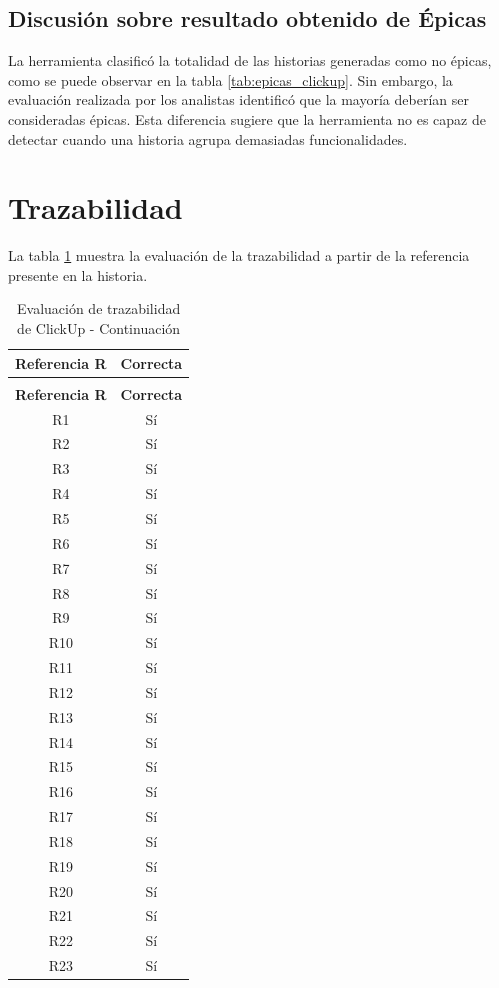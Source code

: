 \subsection{Discusión sobre resultado obtenido de Épicas}
La herramienta clasificó la totalidad de las historias generadas como no épicas, como se puede observar en la tabla \ref{tab:epicas_clickup}. Sin embargo, la evaluación realizada por los analistas identificó que la mayoría deberían ser consideradas épicas. Esta diferencia sugiere que la herramienta no es capaz de detectar cuando una historia agrupa demasiadas funcionalidades.

\section{Trazabilidad}
La tabla \ref{tab:trazabilidad_clickup} muestra la evaluación de la trazabilidad a partir de la referencia presente en la historia.

\begin{longtable}{|c|c|}
\caption{Evaluación de trazabilidad de ClickUp} 
\label{tab:trazabilidad_clickup} \\
\hline
\textbf{Referencia R} & \textbf{Correcta} \\
\hline
\endfirsthead
\caption{Evaluación de trazabilidad de ClickUp - Continuación} \\
\hline
\textbf{Referencia R} & \textbf{Correcta} \\
\hline
\endhead
\hline
\endfoot
\hline
\endlastfoot
R1 & Sí \\
\hline
R2 & Sí \\
\hline
R3 & Sí \\
\hline
R4 & Sí \\
\hline
R5 & Sí \\
\hline
R6 & Sí \\
\hline
R7 & Sí \\
\hline
R8 & Sí \\
\hline
R9 & Sí \\
\hline
R10 & Sí \\
\hline
R11 & Sí \\
\hline
R12 & Sí \\
\hline
R13 & Sí \\
\hline
R14 & Sí \\
\hline
R15 & Sí \\
\hline
R16 & Sí \\
\hline
R17 & Sí \\
\hline
R18 & Sí \\
\hline
R19 & Sí \\
\hline
R20 & Sí \\
\hline
R21 & Sí \\
\hline
R22 & Sí \\
\hline
R23 & Sí \\
\hline
\end{longtable}

